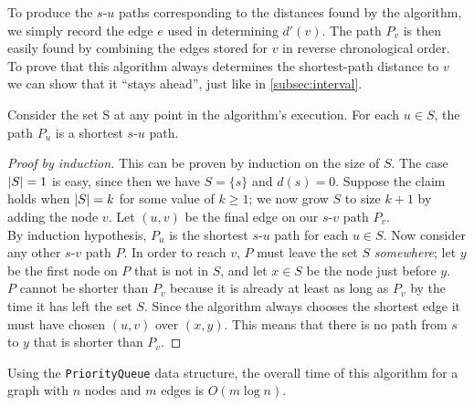 \documentclass[]{article}
\begin{document}
			To produce the $s$-$u$ paths corresponding to the distances found by the algorithm, we simply record the edge $e$ used in determining $d'(v)$. The path $P_v$ is then easily found by combining the edges stored for $v$ in reverse chronological order. \\
			
			To prove that this algorithm always determines the shortest-path distance to $v$ we can show that it ``stays ahead'', just like in \ref{subsec:interval}.
			\begin{theorem}Consider the set S at any point in the algorithm's execution. For each $u \in S$, the path $P_u$ is a shortest $s$-$u$ path.\end{theorem}
			\begin{proof}[Proof by induction]
				This can be proven by induction on the size of $S$. The case $\lvert S \rvert = 1$ is easy, since then we have $S = \{s\}$ and $d(s) = 0$. Suppose the claim holds when $\lvert S \rvert = k$ for some value of $k \ge 1$; we now grow $S$ to size $k+1$ by adding the node $v$. Let $(u,v)$ be the final edge on our $s$-$v$ path $P_v$. \\
				
				By induction hypothesis, $P_u$ is the shortest $s$-$u$ path for each $u \in S$. Now consider any other $s$-$v$ path $P$. In order to reach $v$, $P$ must leave the set $S$ \emph{somewhere}; let $y$ be the first node on $P$ that is not in $S$, and let $x \in S$ be the node just before $y$.\\
				
				$P$ cannot be shorter than $P_v$ because it is already at least as long as $P_v$ by the time it has left the set $S$. Since the algorithm always chooses the shortest edge it must have chosen $(u,v)$ over $(x,y)$. This means that there is no path from $s$ to $y$ that is shorter than $P_v$.
			\end{proof}
			
			Using the \texttt{PriorityQueue} data structure, the overall time of this algorithm for a graph with $n$ nodes and $m$ edges is $O(m \log n)$.
\end{document}
